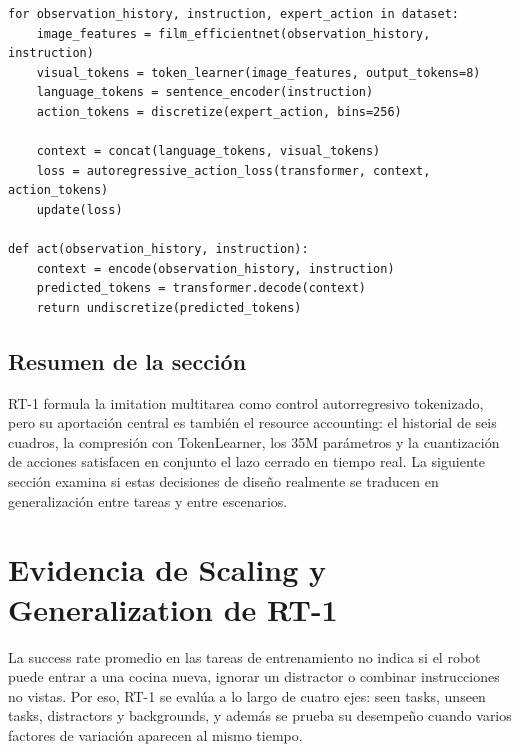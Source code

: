 \documentclass[a4paper]{article}
\begin{document}

\begin{lstlisting}[caption={RT-1-style tokenized imitation loop},label={lst:rt1-loop}]
for observation_history, instruction, expert_action in dataset:
    image_features = film_efficientnet(observation_history, instruction)
    visual_tokens = token_learner(image_features, output_tokens=8)
    language_tokens = sentence_encoder(instruction)
    action_tokens = discretize(expert_action, bins=256)

    context = concat(language_tokens, visual_tokens)
    loss = autoregressive_action_loss(transformer, context, action_tokens)
    update(loss)

def act(observation_history, instruction):
    context = encode(observation_history, instruction)
    predicted_tokens = transformer.decode(context)
    return undiscretize(predicted_tokens)
\end{lstlisting}

\subsection{Resumen de la sección}

RT-1 formula la imitation multitarea como control autorregresivo tokenizado, pero su aportación central es también el resource accounting: el historial de seis cuadros, la compresión con TokenLearner, los 35M parámetros y la cuantización de acciones satisfacen en conjunto el lazo cerrado en tiempo real. La siguiente sección examina si estas decisiones de diseño realmente se traducen en generalización entre tareas y entre escenarios.
\section{Evidencia de Scaling y Generalization de RT-1}

La success rate promedio en las tareas de entrenamiento no indica si el robot puede entrar a una cocina nueva, ignorar un distractor o combinar instrucciones no vistas. Por eso, RT-1 se evalúa a lo largo de cuatro ejes: seen tasks, unseen tasks, distractors y backgrounds, y además se prueba su desempeño cuando varios factores de variación aparecen al mismo tiempo.
\end{document}
